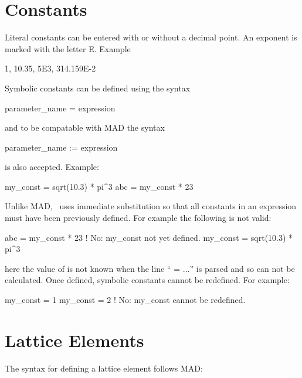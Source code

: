 \section{Constants}

Literal constants can be entered with or without a decimal point. An
exponent is marked with the letter E. Example
\begin{example}
  1, 10.35, 5E3, 314.159E-2
\end{example}
Symbolic constants can be defined using the syntax
\begin{example}
  parameter_name = expression
\end{example}
and to be compatable with MAD the syntax
\begin{example}
  parameter_name := expression
\end{example}
is also accepted. Example:
\begin{example}
  my_const = sqrt(10.3) * pi^3
  abc      = my_const * 23
\end{example}
Unlike MAD, \bmad\ uses immediate substitution so that all constants
in an expression must have been previously defined. For example the
following is not valid:
\begin{example}
  abc      = my_const * 23   ! No: my_const not yet defined.
  my_const = sqrt(10.3) * pi^3
\end{example}
here the value of  is not known when the line ``
= $\ldots$'' is parsed and so  can not be calculated. Once
defined, symbolic constants cannot be redefined. For example:
\begin{example}
  my_const = 1
  my_const = 2  ! No: my_const cannot be redefined.
\end{example}


\section{Lattice Elements}

The syntax for defining a lattice element follows MAD:
\begin{example}
\end{example}
